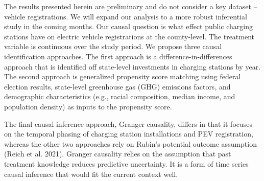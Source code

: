 \documentclass[
  letterpaper,
  DIV=11,
  numbers=noendperiod]{scrartcl}
\begin{document}
The results presented herein are preliminary and do not consider a key
dataset -- vehicle registrations. We will expand our analysis to a more
robust inferential study in the coming months. Our causal question is
what effect public charging stations have on electric vehicle
registrations at the county-level. The treatment variable is continuous
over the study period. We propose three causal identification
approaches. The first approach is a difference-in-differences approach
that is identified off state-level investments in charging stations by
year. The second approach is generalized propensity score matching using
federal election results, state-level greenhouse gas (GHG) emissions
factors, and demographic characteristics (e.g., racial composition,
median income, and population density) as inputs to the propensity
score.

The final causal inference approach, Granger causality, differs in that
it focuses on the temporal phasing of charging station installations and
PEV registration, whereas the other two approaches rely on Rubin's
potential outcome assumption (Reich et al. 2021). Granger causality
relies on the assumption that past treatment knowledge reduces
predictive uncertainty. It is a form of time series causal inference
that would fit the current context well.
\end{document}
